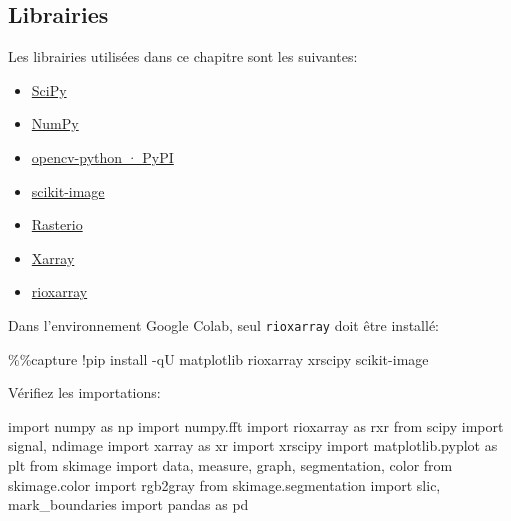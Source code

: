 \documentclass[
  french,
  11pt,
  letterpaper,
  open=any,
  twoside=false,
  french]{scrbook}
\newenvironment{Shaded}{\begin{snugshade}}{\end{snugshade}}
\newcommand{\ImportTok}[1]{\textcolor[rgb]{0.00,0.46,0.62}{#1}}
\newcommand{\NormalTok}[1]{\textcolor[rgb]{0.00,0.23,0.31}{#1}}
\newcommand{\OperatorTok}[1]{\textcolor[rgb]{0.37,0.37,0.37}{#1}}
\begin{document}
\subsection{Librairies}\label{librairies-1}

Les librairies utilisées dans ce chapitre sont les suivantes:

\begin{itemize}
\item
  \href{https://scipy.org/}{SciPy}
\item
  \href{https://numpy.org/}{NumPy}
\item
  \href{https://pypi.org/project/opencv-python/}{opencv-python · PyPI}
\item
  \href{https://scikit-image.org/}{scikit-image}
\item
  \href{https://rasterio.readthedocs.io/en/stable/}{Rasterio}
\item
  \href{https://docs.xarray.dev/en/stable/}{Xarray}
\item
  \href{https://corteva.github.io/rioxarray/stable/index.html}{rioxarray}
\end{itemize}

Dans l'environnement Google Colab, seul \texttt{rioxarray} doit être
installé:

\begin{Shaded}
\begin{Highlighting}[]
\OperatorTok{\%\%}\NormalTok{capture}
\OperatorTok{!}\NormalTok{pip install }\OperatorTok{{-}}\NormalTok{qU matplotlib rioxarray xrscipy scikit}\OperatorTok{{-}}\NormalTok{image}
\end{Highlighting}
\end{Shaded}

Vérifiez les importations:

\begin{Shaded}
\begin{Highlighting}[]
\ImportTok{import}\NormalTok{ numpy }\ImportTok{as}\NormalTok{ np}
\ImportTok{import}\NormalTok{ numpy.fft}
\ImportTok{import}\NormalTok{ rioxarray }\ImportTok{as}\NormalTok{ rxr}
\ImportTok{from}\NormalTok{ scipy }\ImportTok{import}\NormalTok{ signal, ndimage}
\ImportTok{import}\NormalTok{ xarray }\ImportTok{as}\NormalTok{ xr}
\ImportTok{import}\NormalTok{ xrscipy}
\ImportTok{import}\NormalTok{ matplotlib.pyplot }\ImportTok{as}\NormalTok{ plt}
\ImportTok{from}\NormalTok{ skimage }\ImportTok{import}\NormalTok{ data, measure, graph, segmentation, color}
\ImportTok{from}\NormalTok{ skimage.color }\ImportTok{import}\NormalTok{ rgb2gray}
\ImportTok{from}\NormalTok{ skimage.segmentation }\ImportTok{import}\NormalTok{ slic, mark\_boundaries}
\ImportTok{import}\NormalTok{ pandas }\ImportTok{as}\NormalTok{ pd}
\end{Highlighting}
\end{Shaded}
\end{document}
